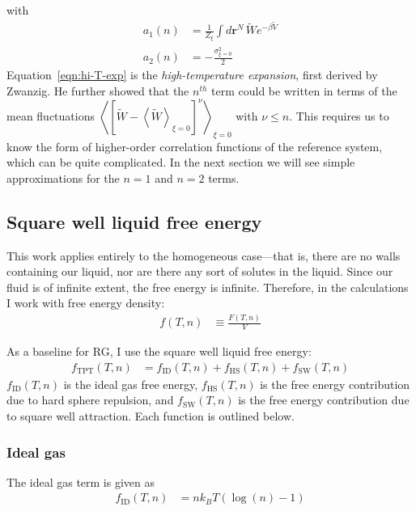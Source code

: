 \documentclass[letterpaper,twocolumn,amsmath,amssymb,prb]{revtex4-1}
\newcommand{\kT}{\ensuremath{k_BT}}
\newcommand{\rr}{\ensuremath{\mathbf{r}}}
\newcommand{\fid}{\ensuremath{f_\text{ID}(T,n)}}
\newcommand{\fhs}{\ensuremath{f_\text{HS}(T,n)}}
\newcommand{\fsw}{\ensuremath{f_\text{SW}(T,n)}}
\newcommand{\Vtilde}{\ensuremath{\widetilde{V}}}
\newcommand{\Wtilde}{\ensuremath{\widetilde{W}}}
\begin{document}
with
\begin{align}
  a_1(n) &= \frac{1}{Z_\xi}\int d\rr^N\, \Wtilde e^{-\beta\Vtilde} \\
  a_2(n) &= -\frac{\sigma_{\xi=0}^2}{2}
\end{align}
Equation~\ref{eqn:hi-T-exp} is the \emph{high-temperature expansion}, first derived by
Zwanzig\cite{Zwanzig54}. He further showed that the $n^{th}$ term could be written in
terms of the mean fluctuations $\left\langle \left[ \Wtilde - \left\langle
  \Wtilde\right\rangle_{\xi=0} \right]^\nu \right\rangle_{\xi=0}$
with $\nu \leq n$. This requires us to know the form of higher-order
correlation functions of the reference system, which can be quite
complicated. In the next section we will see simple approximations for
the $n=1$ and $n=2$ terms.

\subsection{Square well liquid free energy}\label{subsec:SW}

This work applies entirely to the homogeneous case---that is, there
are no walls containing our liquid, nor are there any sort of solutes
in the liquid. Since our fluid is of infinite extent, the free energy
is infinite. Therefore, in the calculations I work with free energy density:
\begin{align}
  f(T,n) &\equiv \frac{F(T,n)}{V}
\end{align}

As a baseline for RG, I use the square well liquid free energy:\cite{Hughes13}
\begin{align}
  f_\text{TPT}(T,n) &= \fid + \fhs + \fsw
\end{align}
$\fid$ is the ideal gas free energy, $\fhs$ is the free energy contribution due to hard sphere
repulsion, and $\fsw$ is the free energy contribution due to square well attraction. Each function is outlined below.

\subsubsection{Ideal gas}\label{sub2sec:ID}
The ideal gas term is given as
\begin{align}
  \fid &= n\kT\left(\log(n) - 1\right)
\end{align}
\end{document}

